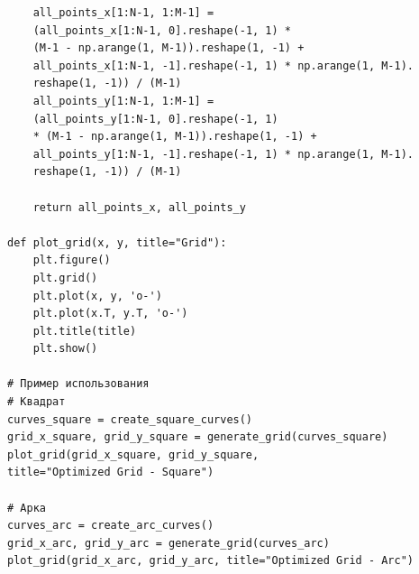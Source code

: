 \documentclass[a4paper,14pt,russian]{extreport}
\renewcommand{\_}{\kern-1.5pt\textunderscore\kern-1.5pt}
\begin{document}
\begin{verbatim}
    all_points_x[1:N-1, 1:M-1] = 
    (all_points_x[1:N-1, 0].reshape(-1, 1) * 
    (M-1 - np.arange(1, M-1)).reshape(1, -1) +                              
    all_points_x[1:N-1, -1].reshape(-1, 1) * np.arange(1, M-1).
    reshape(1, -1)) / (M-1)
    all_points_y[1:N-1, 1:M-1] = 
    (all_points_y[1:N-1, 0].reshape(-1, 1) 
    * (M-1 - np.arange(1, M-1)).reshape(1, -1) +
    all_points_y[1:N-1, -1].reshape(-1, 1) * np.arange(1, M-1).
    reshape(1, -1)) / (M-1)

    return all_points_x, all_points_y

def plot_grid(x, y, title="Grid"):
    plt.figure()
    plt.grid()
    plt.plot(x, y, 'o-')
    plt.plot(x.T, y.T, 'o-')
    plt.title(title)
    plt.show()

# Пример использования
# Квадрат
curves_square = create_square_curves()
grid_x_square, grid_y_square = generate_grid(curves_square)
plot_grid(grid_x_square, grid_y_square,
title="Optimized Grid - Square")

# Арка
curves_arc = create_arc_curves()
grid_x_arc, grid_y_arc = generate_grid(curves_arc)
plot_grid(grid_x_arc, grid_y_arc, title="Optimized Grid - Arc")
\end{verbatim}
\end{document}
